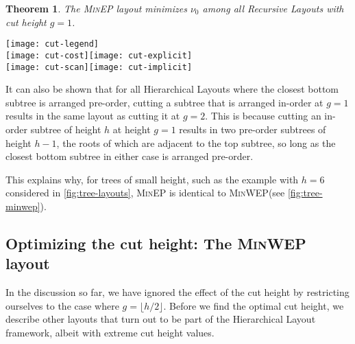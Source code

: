 \documentclass[10pt,conference,letterpaper]{IEEEtran}
\newtheorem{theorem}{Theorem}
\newcommand{\comment}[1]{}
\newcommand{\HL}{Hierarchical Layout\xspace}
\newcommand{\HLs}{Hierarchical Layouts\xspace}
\newcommand{\RLs}{Recursive Layouts\xspace}
\newcommand{\FLOOR}[1]{\ensuremath{\lfloor #1 \rfloor}\xspace}
\newcommand{\pwmean}[1][p]{\ensuremath{\nu_{#1}}\xspace}
\newcommand{\minep}{\textsc{MinEP}\xspace}
\newcommand{\minwep}{\textsc{MinWEP}\xspace}
\begin{document}
\begin{theorem}
\label{thm:order}
The \minep layout minimizes \pwmean[0] among all \RLs with cut height $g=1$.
\end{theorem}
 
\begin{figure*}[tp]
\centering \texttt{[image: cut-legend]}\\[1ex]\texttt{[image: cut-cost]}\hfill \texttt{[image: cut-explicit]}\\[2ex]\texttt{[image: cut-scan]}\hfill \texttt{[image: cut-implicit]}\\\caption{
  Clockwise from top left:
  weighted edge length product \pwmean[0];
  pointer-based search time;
  pointer-less search time;
  and pointer-less search time excluding all memory accesses
  as a function of tree height for several layouts.
}\label{fig:cut}\end{figure*}

It can also be shown that for all \HLs where the closest bottom subtree is arranged pre-order, cutting a subtree that is arranged in-order at $g=1$ results in the same layout as cutting it at $g=2$. This is because cutting an in-order subtree of height $h$ at height $g=1$ results in two pre-order subtrees of height $h-1$, the roots of which are adjacent to the top subtree, so long as the closest bottom subtree in either case is arranged pre-order. 
\comment{
This is equivalent to cutting the top subtree at height $g=2$, 
}
This explains why, for trees of small height, such as the example with $h=6$ considered in \autoref{fig:tree-layouts}, \minep is identical to \minwep (see \autoref{fig:tree-minwep}).

\subsection{Optimizing the cut height: The \minwep layout}
\label{sec:cut-hts}

In the discussion so far, we have ignored the effect of the cut height by restricting ourselves to the case where $g=\FLOOR{h/2}$. Before we find the optimal cut height, we describe other layouts that turn out to be part of the \HL framework, albeit with extreme cut height values.
\end{document}
